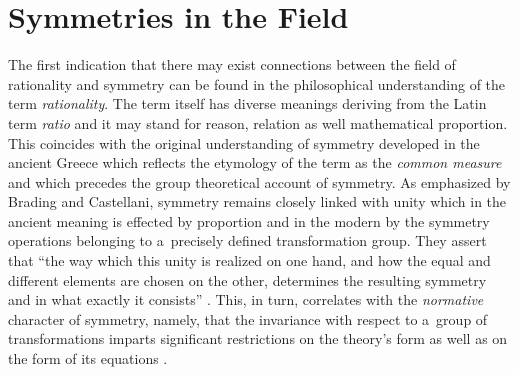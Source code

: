 \section{Symmetries in the Field}

The first indication that there may exist connections between the field of rationality and symmetry can be found in the philosophical understanding of the term \textit{rationality}. The term itself has diverse meanings deriving from the Latin term \textit{ratio} and it may stand for reason, relation as well mathematical proportion. This coincides with the original understanding of symmetry developed in the ancient Greece which reflects the etymology of the term as the \textit{common measure} and which precedes the group theoretical account of symmetry. As emphasized by Brading and Castellani, symmetry remains closely linked with unity which in the ancient meaning is effected by proportion and in the modern by the symmetry operations belonging to a~precisely defined transformation group. They assert that ``the way which this unity is realized on one hand, and how the equal and different elements are chosen on the other, determines the resulting symmetry and in what exactly it consists'' 
\parencite[][p.3]{brading_introduction_2003}. %
 This, in turn, correlates with the \textit{normative} character of symmetry, namely, that the invariance with respect to a~group of transformations imparts significant restrictions on the theory's form as well as on the form of its equations 
\parencite[][p.13]{brading_introduction_2003}.%




